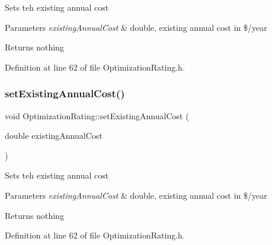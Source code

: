 Sets teh existing annual cost


\begin{DoxyParams}{Parameters}
{\em existing\+Annual\+Cost} & double, existing annual cost in \$/year\\
\hline
\end{DoxyParams}
\begin{DoxyReturn}{Returns}
nothing 
\end{DoxyReturn}


Definition at line 62 of file Optimization\+Rating.\+h.

\mbox{\label{class_optimization_rating_a167d4626ab234baf7facce5fe8e4b32d}} 
\subsubsection{\texorpdfstring{set\+Existing\+Annual\+Cost()}{setExistingAnnualCost()}\hspace{0.1cm}{\footnotesize\ttfamily [3/3]}}
{\footnotesize\ttfamily void Optimization\+Rating\+::set\+Existing\+Annual\+Cost (\begin{DoxyParamCaption}\item[{double}]{existing\+Annual\+Cost }\end{DoxyParamCaption})\hspace{0.3cm}{\ttfamily [inline]}}

Sets teh existing annual cost


\begin{DoxyParams}{Parameters}
{\em existing\+Annual\+Cost} & double, existing annual cost in \$/year\\
\hline
\end{DoxyParams}
\begin{DoxyReturn}{Returns}
nothing 
\end{DoxyReturn}


Definition at line 62 of file Optimization\+Rating.\+h.

\mbox{\label{class_optimization_rating_a4651985a899b2bff18e8356a42c2d37f}} 
